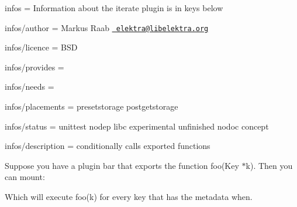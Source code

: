 
\begin{DoxyItemize}
\item infos = Information about the iterate plugin is in keys below
\item infos/author = Markus Raab \href{mailto:elektra@libelektra.org}{\texttt{ elektra@libelektra.\+org}}
\item infos/licence = B\+SD
\item infos/provides =
\item infos/needs =
\item infos/placements = presetstorage postgetstorage
\item infos/status = unittest nodep libc experimental unfinished nodoc concept
\item infos/description = conditionally calls exported functions
\end{DoxyItemize}

Suppose you have a plugin bar that exports the function {\ttfamily foo(\+Key $\ast$k)}. Then you can mount\+:


\begin{DoxyCode}{0}
\end{DoxyCode}


Which will execute {\ttfamily foo(k)} for every key that has the metadata {\ttfamily when}. 